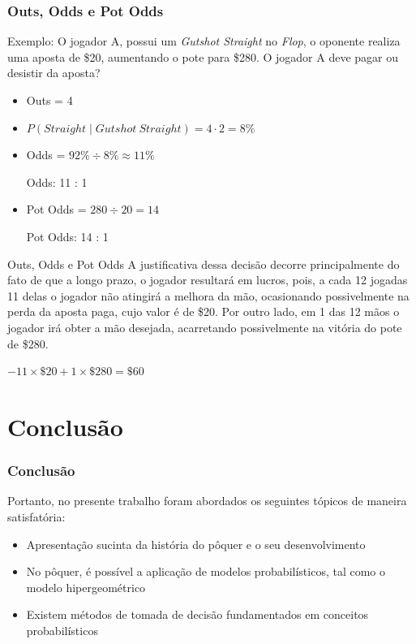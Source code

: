 \documentclass{beamer}
\begin{document}
\begin{frame}
	\frametitle{Outs, Odds e Pot Odds}
	Exemplo: O jogador A, possui um \textit{Gutshot Straight} no \textit{Flop}, o oponente realiza uma aposta de \$20, aumentando o pote para \$280. O jogador A deve pagar ou desistir da aposta?
	\begin{itemize}
		\item Outs = 4
		\item $ P(Straight \mid Gutshot\ Straight) = 4 \cdot 2 = 8\%$
		\item Odds = $92\% \div 8\% \approx 11\%$
		\begin{center}
			Odds: 11 : 1
		\end{center}
		\item Pot Odds = $280 \div 20 = 14$
		\begin{center}
			Pot Odds: 14 : 1
		\end{center}
	\end{itemize}
\end{frame}

\begin{frame}{Outs, Odds e Pot Odds}
	A justificativa dessa decisão decorre principalmente do fato de que a longo prazo, o jogador resultará em lucros, pois, a cada 12 jogadas 11 delas o jogador não atingirá a melhora da mão, ocasionando possivelmente na perda da aposta paga, cujo valor é de \$20. Por outro lado, em 1 das 12 mãos o jogador irá obter a mão desejada, acarretando possivelmente na vitória do pote de \$280.
	\begin{center}
		$-11 \times \$20 + 1 \times \$280 = \$60$
	\end{center} 
\end{frame}

\section{Conclusão}
\begin{frame}
\frametitle{Conclusão} 
Portanto, no presente trabalho foram abordados os seguintes tópicos de maneira satisfatória:
	\begin{itemize}
		\item Apresentação sucinta da história do pôquer e o seu desenvolvimento
		\item No pôquer, é possível a aplicação de modelos probabilísticos, tal como o modelo hipergeométrico
		\item Existem métodos de tomada de decisão fundamentados em conceitos probabilísticos
	\end{itemize}
\end{frame}
\end{document}
